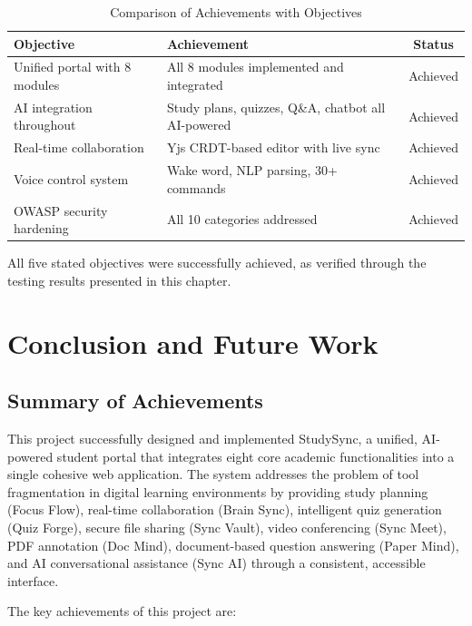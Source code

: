 \documentclass[12pt,a4paper]{report}
\begin{document}
\begin{table}[h]
\centering
\caption{Comparison of Achievements with Objectives}
\begin{tabular}{p{5cm}p{5cm}c}
\toprule
\textbf{Objective} & \textbf{Achievement} & \textbf{Status} \\
\midrule
Unified portal with 8 modules & All 8 modules implemented and integrated & Achieved \\
AI integration throughout & Study plans, quizzes, Q\&A, chatbot all AI-powered & Achieved \\
Real-time collaboration & Yjs CRDT-based editor with live sync & Achieved \\
Voice control system & Wake word, NLP parsing, 30+ commands & Achieved \\
OWASP security hardening & All 10 categories addressed & Achieved \\
\bottomrule
\end{tabular}
\label{tab:objectives}
\end{table}

All five stated objectives were successfully achieved, as verified through the testing results presented in this chapter.

\chapter{Conclusion and Future Work}

\section{Summary of Achievements}

This project successfully designed and implemented StudySync, a unified, AI-powered student portal that integrates eight core academic functionalities into a single cohesive web application. The system addresses the problem of tool fragmentation in digital learning environments by providing study planning (Focus Flow), real-time collaboration (Brain Sync), intelligent quiz generation (Quiz Forge), secure file sharing (Sync Vault), video conferencing (Sync Meet), PDF annotation (Doc Mind), document-based question answering (Paper Mind), and AI conversational assistance (Sync AI) through a consistent, accessible interface.

The key achievements of this project are:
\end{document}
